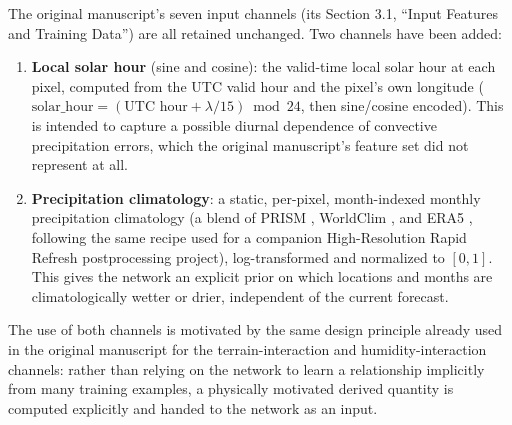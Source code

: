 \documentclass[11pt]{article}
\begin{document}
The original manuscript's seven input channels (its Section 3.1,
``Input Features and Training Data'') are all retained unchanged. Two
channels have been added:

\begin{enumerate}[label=(\arabic*)]
  \item \textbf{Local solar hour} (sine and cosine): the valid-time
        local solar hour at each pixel, computed from the UTC valid
        hour and the pixel's own longitude ($\text{solar\_hour} =
        (\text{UTC hour} + \lambda/15) \bmod 24$, then sine/cosine
        encoded). This is intended to capture a possible diurnal 
        dependence of convective precipitation errors, which the 
        original manuscript's feature set did not represent at all.
  \item \textbf{Precipitation climatology}: a static, per-pixel,
        month-indexed monthly precipitation climatology (a blend of
        PRISM \citep[Parameter-elevation Regressions on Independent
        Slopes Model;][]{daly2008}, WorldClim \citep{fick2017}, and
        ERA5 \citep[the ECMWF fifth-generation atmospheric
        reanalysis;][]{hersbach2020}, following the same recipe used
        for a companion High-Resolution Rapid Refresh
        \citep[HRRR;][]{benjamin2016, dowell2022} postprocessing
        project), log-transformed and
        normalized to $[0,1]$. This gives the network an explicit prior
        on which locations and months are climatologically wetter or
        drier, independent of the current forecast.
\end{enumerate}

The use of both channels is motivated by the same design principle already used
in the original manuscript for the terrain-interaction and
humidity-interaction channels: rather than relying on the network to
learn a relationship implicitly from many training examples, a
physically motivated derived quantity is computed explicitly and
handed to the network as an input.
\end{document}
